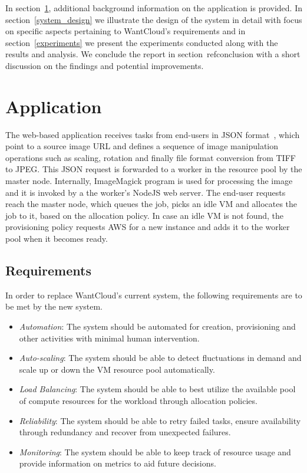 \documentclass[a4paper]{IEEEtran}
\begin{document}
In section~\ref{application}, additional background information on the application is provided. In section~\ref{system_design} we illustrate the design of the system in detail with focus on specific aspects pertaining to
WantCloud's requirements and in section~\ref{experiments} we present the experiments conducted along with the
results and analysis. We conclude the report in section~ref{conclusion} with a short discussion on the findings and potential improvements.

\section{Application} \label{application}

The web-based application receives tasks from end-users in JSON format~\cite{rfc7159}, which point to a source image URL and defines a sequence of image manipulation operations such as scaling, rotation and finally file format conversion from TIFF to JPEG. This JSON request is forwarded to a worker in the resource pool by the master node.  Internally, ImageMagick program is used for processing the image and it is invoked by a the worker's NodeJS web server. The end-user requests reach the master node, which queues the job, picks an idle VM and allocates the job
to it, based on the allocation policy. In case an idle VM is not found, the provisioning policy requests AWS for a new instance and adds it to the worker pool when it becomes ready.

\subsection{Requirements}

In order to replace WantCloud's current system, the following requirements are to be met by the new system.

\begin{itemize}
  \item \emph{Automation}: The system should be automated for creation, provisioning and other activities
  with minimal human intervention.
  \item \emph{Auto-scaling}: The system should be able to detect fluctuations in demand and scale up or down the VM resource pool automatically.
  \item \emph{Load Balancing}: The system should be able to best utilize the available pool of compute resources
  for the workload through allocation policies.
  \item \emph{Reliability}: The system should be able to retry failed tasks, ensure availability through redundancy and recover from unexpected failures.
  \item \emph{Monitoring}: The system should be able to keep track of resource usage and provide information
  on metrics to aid future decisions.
\end{itemize}
\end{document}
